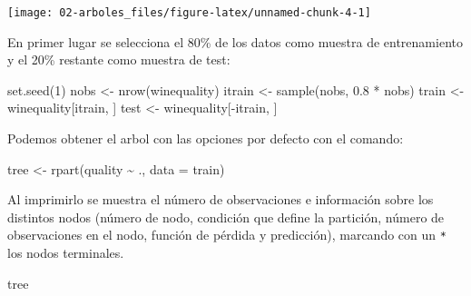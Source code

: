\documentclass[
]{book}
\newenvironment{Shaded}{\begin{snugshade}}{\end{snugshade}}
\newcommand{\AttributeTok}[1]{\textcolor[rgb]{0.77,0.63,0.00}{#1}}
\newcommand{\DecValTok}[1]{\textcolor[rgb]{0.00,0.00,0.81}{#1}}
\newcommand{\FloatTok}[1]{\textcolor[rgb]{0.00,0.00,0.81}{#1}}
\newcommand{\FunctionTok}[1]{\textcolor[rgb]{0.00,0.00,0.00}{#1}}
\newcommand{\NormalTok}[1]{#1}
\newcommand{\OtherTok}[1]{\textcolor[rgb]{0.56,0.35,0.01}{#1}}
\newcommand{\SpecialCharTok}[1]{\textcolor[rgb]{0.00,0.00,0.00}{#1}}
\theoremstyle{break}
\theoremstyle{definition}
\theoremstyle{definition}
\theoremstyle{definition}
\theoremstyle{definition}
\theoremstyle{remark}
\begin{document}
\begin{Shaded}
\end{Shaded}

\begin{center}\texttt{[image: 02-arboles\_files/figure-latex/unnamed-chunk-4-1]} \end{center}

En primer lugar se selecciona el 80\% de los datos como muestra de entrenamiento y el 20\% restante como muestra de test:

\begin{Shaded}
\begin{Highlighting}[]
\FunctionTok{set.seed}\NormalTok{(}\DecValTok{1}\NormalTok{)}
\NormalTok{nobs }\OtherTok{\textless{}{-}} \FunctionTok{nrow}\NormalTok{(winequality)}
\NormalTok{itrain }\OtherTok{\textless{}{-}} \FunctionTok{sample}\NormalTok{(nobs, }\FloatTok{0.8} \SpecialCharTok{*}\NormalTok{ nobs)}
\NormalTok{train }\OtherTok{\textless{}{-}}\NormalTok{ winequality[itrain, ]}
\NormalTok{test }\OtherTok{\textless{}{-}}\NormalTok{ winequality[}\SpecialCharTok{{-}}\NormalTok{itrain, ]}
\end{Highlighting}
\end{Shaded}

Podemos obtener el arbol con las opciones por defecto con el comando:

\begin{Shaded}
\begin{Highlighting}[]
\NormalTok{tree }\OtherTok{\textless{}{-}} \FunctionTok{rpart}\NormalTok{(quality }\SpecialCharTok{\textasciitilde{}}\NormalTok{ ., }\AttributeTok{data =}\NormalTok{ train)}
\end{Highlighting}
\end{Shaded}

Al imprimirlo se muestra el número de observaciones e información
sobre los distintos nodos (número de nodo, condición que define la partición,
número de observaciones en el nodo, función de pérdida y predicción),
marcando con un \texttt{*} los nodos terminales.

\begin{Shaded}
\begin{Highlighting}[]
\NormalTok{tree}
\end{Highlighting}
\end{Shaded}
\end{document}
